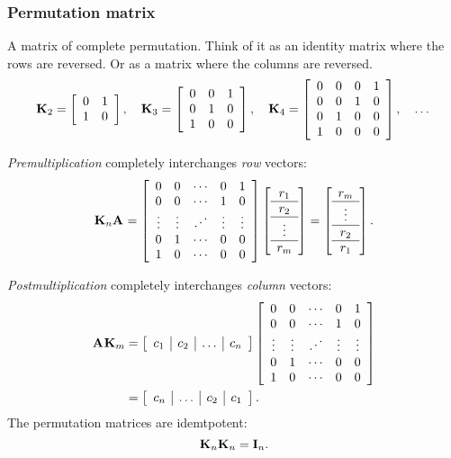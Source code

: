 \subsubsection*{Permutation matrix}
A matrix of complete permutation. Think of it as an identity matrix where the rows are reversed. Or as a matrix where the columns are reversed.
\begin{equation}
  \K{2} = \ktwo, \quad \K{3} = \kthree, \quad \K{4} = \kfour, \quad \dots
\end{equation}

\textit{Premultiplication} completely interchanges \textit{row} vectors:
\begin{equation}
  \begin{split}
   \K{n}\A{} = \mat{ccccc}
  {0 & 0 & \cdots & 0 & 1\\
   0 & 0 & \cdots & 1 & 0\\
   \vdots & \vdots & \iddots & \vdots & \vdots\\
   0 & 1 & \cdots & 0 & 0\\
   1 & 0 & \cdots & 0 & 0}
   \mat{c}
  {r_{1} \\\hline r_{2} \\\hline \vdots \\\hline r_{m}}
    =
   \mat{c}
  {r_{m} \\\hline \vdots \\\hline r_{2} \\\hline r_{1}}.
  \end{split}
\end{equation}

\textit{Postmultiplication} completely interchanges \textit{column} vectors:
\begin{equation}
  \begin{split}
  \A{}\K{m} &=    
   \mat{c|c|c|c}
  {c_{1} & c_{2} & \dots & c_{n}}
   \mat{ccccc}
  {0 & 0 & \cdots & 0 & 1\\
   0 & 0 & \cdots & 1 & 0\\
   \vdots & \vdots & \iddots & \vdots & \vdots\\
   0 & 1 & \cdots & 0 & 0\\
   1 & 0 & \cdots & 0 & 0}\\
   & = \mat{c|c|c|c}
  {c_{n} & \dots  & c_{2} & c_{1}}.
  \end{split}
\end{equation}
The permutation matrices are idemtpotent:
\begin{equation}
  \K{n}\K{n} = \I{n}.
\end{equation}

